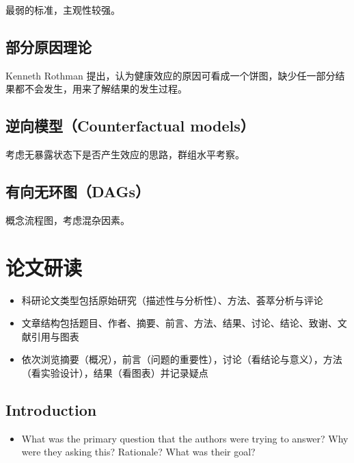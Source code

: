 \documentclass[
]{book}
\providecommand{\tightlist}{%
  \setlength{\itemsep}{0pt}\setlength{\parskip}{0pt}}
\begin{document}
最弱的标准，主观性较强。

\hypertarget{ux90e8ux5206ux539fux56e0ux7406ux8bba}{%
\subsection{部分原因理论}\label{ux90e8ux5206ux539fux56e0ux7406ux8bba}}

Kenneth Rothman 提出，认为健康效应的原因可看成一个饼图，缺少任一部分结果都不会发生，用来了解结果的发生过程。

\hypertarget{ux9006ux5411ux6a21ux578bcounterfactual-models}{%
\subsection{逆向模型（Counterfactual models）}\label{ux9006ux5411ux6a21ux578bcounterfactual-models}}

考虑无暴露状态下是否产生效应的思路，群组水平考察。

\hypertarget{ux6709ux5411ux65e0ux73afux56fedags}{%
\subsection{有向无环图（DAGs）}\label{ux6709ux5411ux65e0ux73afux56fedags}}

概念流程图，考虑混杂因素。

\hypertarget{ux8bbaux6587ux7814ux8bfb}{%
\section{论文研读}\label{ux8bbaux6587ux7814ux8bfb}}

\begin{itemize}
\tightlist
\item
  科研论文类型包括原始研究（描述性与分析性）、方法、荟萃分析与评论
\item
  文章结构包括题目、作者、摘要、前言、方法、结果、讨论、结论、致谢、文献引用与图表
\item
  依次浏览摘要（概况），前言（问题的重要性），讨论（看结论与意义），方法（看实验设计），结果（看图表）并记录疑点
\end{itemize}

\hypertarget{introduction}{%
\subsection{Introduction}\label{introduction}}

\begin{itemize}
\tightlist
\item
  What was the primary question that the authors were trying to answer? Why were they asking this? Rationale? What was their goal?
\end{itemize}
\end{document}
